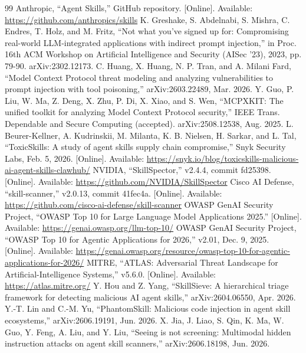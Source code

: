 \documentclass[conference]{IEEEtran}
\begin{document}
\begin{thebibliography}{99}
 Anthropic, ``Agent Skills,'' GitHub repository. [Online]. Available: \url{https://github.com/anthropics/skills}
 K. Greshake, S. Abdelnabi, S. Mishra, C. Endres, T. Holz, and M. Fritz, ``Not what you've signed up for: Compromising real-world LLM-integrated applications with indirect prompt injection,'' in Proc. 16th ACM Workshop on Artificial Intelligence and Security (AISec '23), 2023, pp. 79-90. arXiv:2302.12173.
 C. Huang, X. Huang, N. P. Tran, and A. Milani Fard, ``Model Context Protocol threat modeling and analyzing vulnerabilities to prompt injection with tool poisoning,'' arXiv:2603.22489, Mar. 2026.
 Y. Guo, P. Liu, W. Ma, Z. Deng, X. Zhu, P. Di, X. Xiao, and S. Wen, ``MCPXKIT: The unified toolkit for analyzing Model Context Protocol security,'' IEEE Trans. Dependable and Secure Computing (accepted). arXiv:2508.12538, Aug. 2025.
 L. Beurer-Kellner, A. Kudrinskii, M. Milanta, K. B. Nielsen, H. Sarkar, and L. Tal, ``ToxicSkills: A study of agent skills supply chain compromise,'' Snyk Security Labs, Feb. 5, 2026. [Online]. Available: \url{https://snyk.io/blog/toxicskills-malicious-ai-agent-skills-clawhub/}
 NVIDIA, ``SkillSpector,'' v2.4.4, commit fd25398. [Online]. Available: \url{https://github.com/NVIDIA/SkillSpector}
 Cisco AI Defense, ``skill-scanner,'' v2.0.13, commit 41fec4a. [Online]. Available: \url{https://github.com/cisco-ai-defense/skill-scanner}
 OWASP GenAI Security Project, ``OWASP Top 10 for Large Language Model Applications 2025.'' [Online]. Available: \url{https://genai.owasp.org/llm-top-10/}
 OWASP GenAI Security Project, ``OWASP Top 10 for Agentic Applications for 2026,'' v2.01, Dec. 9, 2025. [Online]. Available: \url{https://genai.owasp.org/resource/owasp-top-10-for-agentic-applications-for-2026/}
 MITRE, ``ATLAS: Adversarial Threat Landscape for Artificial-Intelligence Systems,'' v5.6.0. [Online]. Available: \url{https://atlas.mitre.org/}
 Y. Hou and Z. Yang, ``SkillSieve: A hierarchical triage framework for detecting malicious AI agent skills,'' arXiv:2604.06550, Apr. 2026.
 Y.-T. Lin and C.-M. Yu, ``PhantomSkill: Malicious code injection in agent skill ecosystems,'' arXiv:2606.19191, Jun. 2026.
 X. Jia, J. Liao, S. Qin, K. Ma, W. Guo, Y. Feng, A. Liu, and Y. Liu, ``Seeing is not screening: Multimodal hidden instruction attacks on agent skill scanners,'' arXiv:2606.18198, Jun. 2026.

\end{thebibliography}
\end{document}
